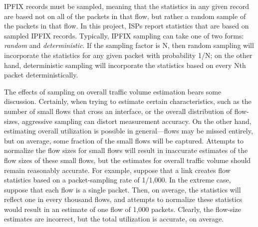 IPFIX records must be sampled, meaning that the statistics in any given
record are based not on all of the packets in that flow, but rather a
random sample of the packets in that flow. In this project, ISPs report
statistics that are based on sampled IPFIX records.  Typically, IPFIX
sampling can take one of two forms: {\em random} and {\em
  deterministic}. If the sampling factor is N, then random sampling will
incorporate the statistics for any given packet with probability 1/N; on
the other hand, deterministic sampling will incorporate the statistics
based on every Nth packet deterministically.

The effects of sampling on overall traffic volume estimation bears some
discussion. Certainly, when trying to estimate certain characteristics,
such as the number of small flows that cross an interface, or the
overall distribution of flow-sizes, aggressive sampling can distort
measurement accuracy. On the other hand, estimating overall utilization
is possible in general---flows may be missed entirely, but on
average, some fraction of the small flows will be captured. Attempts to
normalize the flow sizes for small flows will result in inaccurate
estimates of the flow sizes of these small flows, but the estimates for
overall traffic volume should remain reasonably accurate. For example,
suppose that a link creates flow statistics based on a packet-sampling
rate of 1/1,000. In the extreme case, suppose that each flow is a single
packet. Then, on average, the statistics will reflect one in every
thousand flows, and attempts to normalize these statistics would result
in an estimate of one flow of 1,000 packets. Clearly, the flow-size
estimates are incorrect, but the total utilization is accurate,
on average.   



